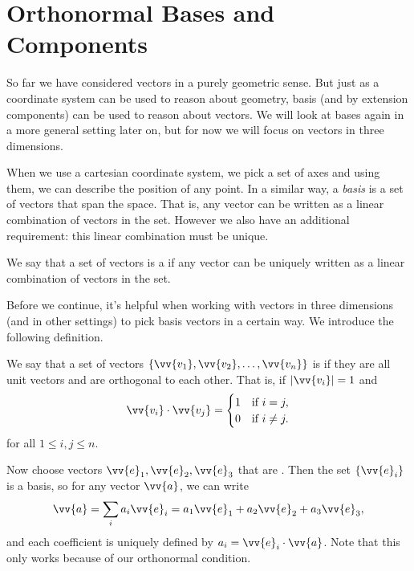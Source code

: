\section{Orthonormal Bases and Components}

So far we have considered vectors in a purely geometric sense. But just as a coordinate system can be used to reason about geometry, basis (and by extension components) can be used to reason about vectors. We will look at bases again in a more general setting later on, but for now we will focus on vectors in three dimensions.

When we use a cartesian coordinate system, we pick a set of axes and using them, we can describe the position of any point. In a similar way, a \emph{basis} is a set of vectors that span the space. That is, any vector can be written as a linear combination of vectors in the set. However we also have an additional requirement: this linear combination must be unique.

\begin{definition}
    We say that a set of vectors is a  if any vector can be uniquely written as a linear combination of vectors in the set.
\end{definition}

Before we continue, it's helpful when working with vectors in three dimensions (and in other settings) to pick basis vectors in a certain way. We introduce the following definition.

\begin{definition}[Orthonormal]
    We say that a set of vectors $\{\vv{v_1}, \vv{v_2}, \dots, \vv{v_n} \}$ is  if they are all unit vectors and are orthogonal to each other. That is, if $|\vv{v_i}| = 1$ and
    $$
        \vv{v_i} \cdot \vv{v_j} = \begin{cases}
            1 &\mbox{if } i = j, \\
            0 &\mbox{if } i \neq j.
           \end{cases}
    $$
    for all $1 \leq i, j \leq n$.
\end{definition}

Now choose vectors $\vv{e}_1, \vv{e}_2, \vv{e}_3$ that are . Then the set $\{\vv{e}_i \}$ is a basis, so for any vector $\vv{a}$, we can write
$$
\vv{a} = \sum_{i} a_i \vv{e}_i = a_1 \vv{e}_1 + a_2 \vv{e}_2 + a_3 \vv{e}_3,
$$
and each coefficient is uniquely defined by $a_i = \vv{e}_i \cdot \vv{a}$. Note that this only works because of our orthonormal condition.

